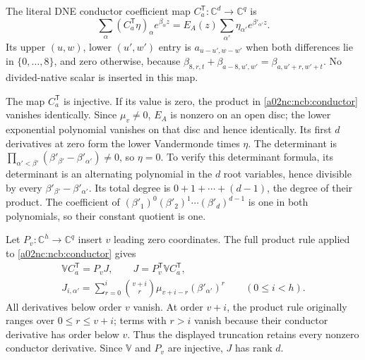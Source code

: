 \documentclass[11pt,a4paper]{article}
\begin{document}
The literal DNE conductor coefficient map
$C_a^{\mathsf T}:\mathbb C^d\to\mathbb C^q$ is
\begin{equation}\tag{NCB3}\label{a02nc:ncb:conductor}
\sum_\alpha(C_a^{\mathsf T}\eta)_\alpha e^{\beta_\alpha z}
=E_A(z)\sum_{\alpha'}\eta_{\alpha'}e^{\beta'_{\alpha'}z}.
\end{equation}
Its upper $(u,w)$, lower $(u',w')$ entry is
$a_{u-u',w-w'}$ when both differences lie in $\{0,\ldots,8\}$, and
zero otherwise, because
$\beta_{8,r,t}+\beta_{a-8,u',w'}=\beta_{a,u'+r,w'+t}$.
No divided-native scalar is inserted in this map.

The map $C_a^{\mathsf T}$ is injective. If its value is zero, the
product in \eqref{a02nc:ncb:conductor} vanishes identically. Since
$\mu_v\ne0$, $E_A$ is nonzero on an open disc; the lower exponential
polynomial vanishes on that disc and hence identically. Its first $d$
derivatives at zero form the lower Vandermonde times $\eta$. The
determinant is
$\prod_{\alpha'<\beta'}(\beta'_{\beta'}-\beta'_{\alpha'})\ne0$,
so $\eta=0$.
To verify this determinant formula, its determinant is an alternating
polynomial in the $d$ root variables, hence divisible by every
$\beta'_{\beta'}-\beta'_{\alpha'}$. Its total degree is
$0+1+\cdots+(d-1)$, the degree of their product. The coefficient of
$(\beta'_1)^0(\beta'_2)^1\cdots(\beta'_d)^{d-1}$ is one in both
polynomials, so their constant quotient is one.

Let $P_v:\mathbb C^h\to\mathbb C^q$ insert $v$ leading zero
coordinates. The full product rule applied to \eqref{a02nc:ncb:conductor}
gives
\begin{equation}\tag{NCB4}\label{a02nc:ncb:moment-conductor}
\begin{gathered}
\mathbb VC_a^{\mathsf T}=P_vJ,\qquad
J=P_v^{\mathsf T}\mathbb VC_a^{\mathsf T},\\
J_{i,\alpha'}=\sum_{r=0}^{i}
\binom{v+i}{r}\mu_{v+i-r}(\beta'_{\alpha'})^r
\qquad(0\leq i<h).
\end{gathered}
\end{equation}
All derivatives below order $v$ vanish. At order $v+i$, the product
rule originally ranges over $0\leq r\leq v+i$; terms with $r>i$
vanish because their conductor derivative has order below $v$.
Thus the displayed truncation retains every nonzero conductor
derivative. Since $\mathbb V$ and $P_v$ are injective, $J$ has rank $d$.
\end{document}
